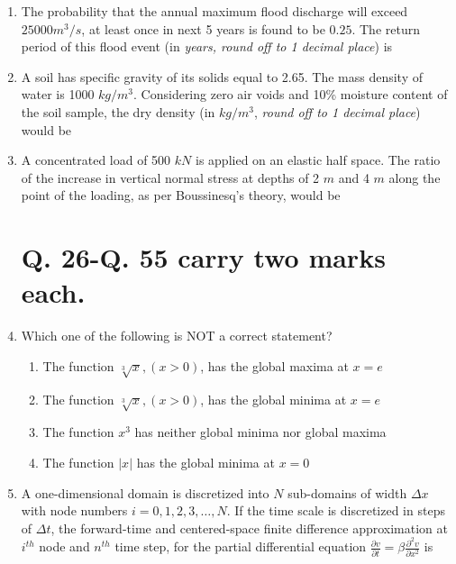 \documentclass[journal,12pt,onecolumn]{IEEEtran}
\theoremstyle{remark}
\begin{document}
\begin{enumerate}
\hfill{}

\item The probability that the annual maximum flood discharge will exceed $25000 m^3/s$, at least once in next 5 years is found to be $0.25$. The return period of this flood event (in \textit{years, round off to 1 decimal place}) is \underline{\hspace{3cm}}

\hfill{}

\item A soil has specific gravity of its solids equal to 2.65. The mass density of water is 1000 $kg/m^3$. Considering zero air voids and 10\% moisture content of the soil sample, the dry density (in $kg/m^3$, \textit{round off to 1 decimal place}) would be \underline{\hspace{3cm}}

\hfill{}

\item A concentrated load of 500 $kN$ is applied on an elastic half space. The ratio of the increase in vertical normal stress at depths of 2 $m$ and 4 $m$ along the point of the loading, as per Boussinesq’s theory, would be \underline{\hspace{3cm}}

\hfill{}

\section*{Q. 26-Q. 55 carry two marks each.}
\item Which one of the following is NOT a correct statement?

\hfill{}
\begin{enumerate}
\item The function $\sqrt[3]{x}, (x>0)$, has the global maxima at $x = e$
\item The function $\sqrt[3]{x}, (x>0)$, has the global minima at $x = e$
\item The function $x^3$ has neither global minima nor global maxima
\item The function $|x|$ has the global minima at $x = 0$
\end{enumerate}
    
\item A one-dimensional domain is discretized into $N$ sub-domains of width $\Delta x$ with node numbers $i=0,1,2,3,\ldots,N$. If the time scale is discretized in steps of $\Delta t$, the forward-time and centered-space finite difference approximation at $i^{th}$ node and $n^{th}$ time step, for the partial differential equation $\frac{\partial v}{\partial t} = \beta \frac{\partial^2 v}{\partial x^2}$ is


\end{enumerate}
\end{document}
